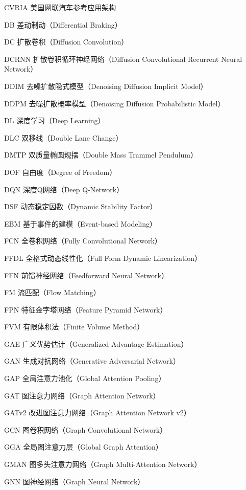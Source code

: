 \begin{denotation}[3cm]
  \item[CVRIA] 美国网联汽车参考应用架构
  \item[DB] 差动制动（Differential Braking）
  \item[DC] 扩散卷积（Diffusion Convolution）
  \item[DCRNN] 扩散卷积循环神经网络（Diffusion Convolutional Recurrent Neural Network）
  \item[DDIM] 去噪扩散隐式模型（Denoising Diffusion Implicit Model）
  \item[DDPM] 去噪扩散概率模型（Denoising Diffusion Probabilistic Model）
  \item[DL] 深度学习（Deep Learning）
  \item[DLC] 双移线（Double Lane Change）
  \item[DMTP] 双质量椭圆规摆（Double Mass Trammel Pendulum）
  \item[DOF] 自由度（Degree of Freedom）
  \item[DQN] 深度Q网络（Deep Q-Network）
  \item[DSF] 动态稳定因数（Dynamic Stability Factor）
  \item[EBM] 基于事件的建模（Event-based Modeling）
  \item[FCN] 全卷积网络（Fully Convolutional Network）
  \item[FFDL] 全格式动态线性化（Full Form Dynamic Linearization）
  \item[FFN] 前馈神经网络（Feedforward Neural Network）
  \item[FM] 流匹配（Flow Matching）
  \item[FPN] 特征金字塔网络（Feature Pyramid Network）
  \item[FVM] 有限体积法（Finite Volume Method）
  \item[GAE] 广义优势估计（Generalized Advantage Estimation）
  \item[GAN] 生成对抗网络（Generative Adversarial Network）
  \item[GAP] 全局注意力池化（Global Attention Pooling）
  \item[GAT] 图注意力网络（Graph Attention Network）
  \item[GATv2] 改进图注意力网络（Graph Attention Network v2）
  \item[GCN] 图卷积网络（Graph Convolutional Network）
  \item[GGA] 全局图注意力层（Global Graph Attention）
  \item[GMAN] 图多头注意力网络（Graph Multi-Attention Network）
  \item[GNN] 图神经网络（Graph Neural Network）

\end{denotation}
